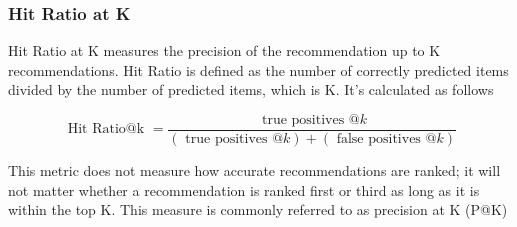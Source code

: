 \documentclass{kththesis}
\begin{document}
\subsubsection{Hit Ratio at K}
Hit Ratio at K measures the precision of the recommendation up to K recommendations. Hit Ratio is defined as the
number of correctly predicted items divided by the number of predicted
items, which is K. It's calculated as follows

\begin{equation}
\text { Hit Ratio@k }=\frac{\text { true positives } @ k}{(\text { true positives } @ k)+(\text { false positives } @ k)}
\end{equation}

This metric does not measure how accurate recommendations are ranked; it will not matter whether a recommendation is ranked first or third as long as it is within the top K. This measure is commonly referred to as precision at K (P@K)



\end{document}
